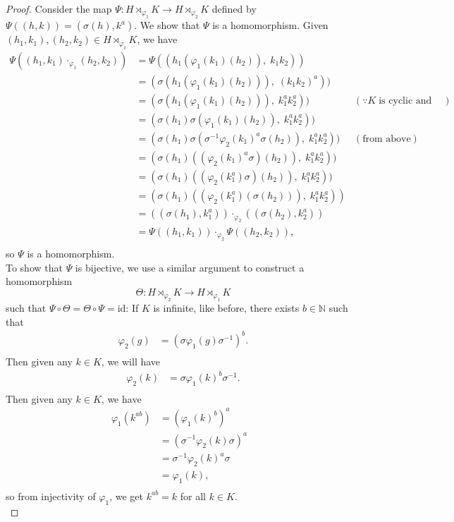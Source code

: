 \documentclass{article}
\begin{document}
\begin{enumerate}[label={\bf Q\arabic*:}]
\begin{proof}
      Consider the map $\Psi:H\rtimes_{\varphi_1}K\rightarrow
      H\rtimes_{\varphi_2}K$ defined by $\Psi((h,k))=(\sigma(h),k^a)$. We
      show that $\Psi$ is a homomorphism. Given $(h_1,k_1),(h_2,k_2)\in
      H\rtimes_{\varphi_1}K$, we have
      \begin{align*}
        \Psi((h_1,k_1)\cdot_{\varphi_1}(h_2,k_2)) &=
          \Psi((h_1(\varphi_1(k_1)(h_2)),\;
          k_1k_2)) & \\
          &= (\sigma(h_1(\varphi_1(k_1)(h_2))),\; (k_1k_2)^a)) & \\
          &= (\sigma(h_1(\varphi_1(k_1)(h_2))),\; k_1^ak_2^a)) & (\because K\;
          \text{is cyclic and hence abelian}) \\
          &= (\sigma(h_1)\sigma(\varphi_1(k_1)(h_2)),\; k_1^ak_2^a)) & \\
          &= (\sigma(h_1)\sigma(\sigma^{-1}\varphi_2(k_1)^a\sigma(h_2)),\;
          k_1^ak_2^a)) & (\text{from above}) \\
          &= (\sigma(h_1)((\varphi_2(k_1)^a\sigma)(h_2)),\; k_1^ak_2^a)) & \\
          &= (\sigma(h_1)((\varphi_2(k_1^a)\sigma)(h_2)),\; k_1^ak_2^a)) & \\
          &= (\sigma(h_1)((\varphi_2(k_1^a)(\sigma(h_2))),\; k_1^ak_2^a)) & \\
          &= ((\sigma(h_1),k_1^a)) \cdot_{\varphi_2} ((\sigma(h_2),k_2^a)) & \\
          &= \Psi((h_1,k_1)) \cdot_{\varphi_2} \Psi((h_2,k_2)), & \\
      \end{align*}
      so $\Psi$ is a homomorphism. \\

      To show that $\Psi$ is bijective, we use a similar argument to
      construct a homomorphism \[\Theta:H\rtimes_{\varphi_2}K\rightarrow
      H\rtimes_{\varphi_1}K\] such that
      $\Psi\circ\Theta=\Theta\circ\Psi=\text{id}$: If $K$ is infinite, like
      before, there exists $b\in\mathbb{N}$ such that
      \begin{align*}
        \varphi_2(g)  &= (\sigma\varphi_1(g)\sigma^{-1})^b. \\
      \end{align*}
      Then given any $k\in K$, we will have
      \begin{align*}
        \varphi_2(k)  &= \sigma\varphi_1(k)^b\sigma^{-1}. \\
      \end{align*}
      Then given any $k\in K$, we have
      \begin{align*}
        \varphi_1(k^{ab}) &= (\varphi_1(k)^b)^a & \\
                          &= (\sigma^{-1}\varphi_2(k)\sigma)^a & \\
                          &= \sigma^{-1}\varphi_2(k)^a\sigma & \\
                          &= \varphi_1(k), & \\
      \end{align*}
      so from injectivity of $\varphi_1$, we get $k^{ab}=k$ for all $k\in
      K$. \\


\end{proof}
\end{enumerate}
\end{document}
